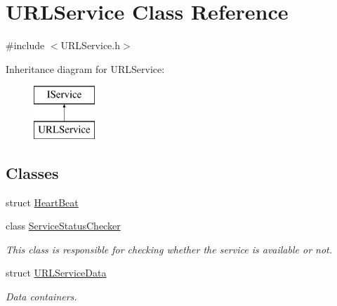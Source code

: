 \hypertarget{class_u_r_l_service}{}\section{U\+R\+L\+Service Class Reference}
\label{class_u_r_l_service}


{\ttfamily \#include $<$U\+R\+L\+Service.\+h$>$}

Inheritance diagram for U\+R\+L\+Service\+:\begin{figure}[H]
\begin{center}
\leavevmode
\includegraphics[height=2.000000cm]{class_u_r_l_service}
\end{center}
\end{figure}
\subsection*{Classes}
\begin{DoxyCompactItemize}
\item 
struct \hyperlink{struct_u_r_l_service_1_1_heart_beat}{Heart\+Beat}
\item 
class \hyperlink{class_u_r_l_service_1_1_service_status_checker}{Service\+Status\+Checker}
\begin{DoxyCompactList}\small\item\em This class is responsible for checking whether the service is available or not. \end{DoxyCompactList}\item 
struct \hyperlink{struct_u_r_l_service_1_1_u_r_l_service_data}{U\+R\+L\+Service\+Data}
\begin{DoxyCompactList}\small\item\em Data containers. \end{DoxyCompactList}\end{DoxyCompactItemize}
